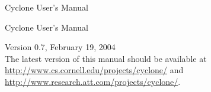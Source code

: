 \newif\ifpdf
\ifx\pdfoutput\undefined
  \pdffalse               %
\else
  \pdftrue
\fi

\usepackage{alltt}

\usepackage{makeidx}
\makeindex
\usepackage{color}
\usepackage{palatino}
\usepackage[colorlinks=true,linkcolor=bluegray,anchorcolor=bluegray,
citecolor=bluegray,filecolor=bluegray,menucolor=bluegray,pagecolor=bluegray,
urlcolor=bluegray]{hyperref}

\ifscreen
\setlength\paperheight{6in}
\setlength\paperwidth{8in}
\setlength\oddsidemargin{-.5in}
\setlength\textwidth{7in}
\setlength\topmargin{-1in}
\setlength\textheight{5in}
\ifpdf
\pdfpageheight=6in
\pdfpagewidth=8in
\fi %
\fi %

\usepackage{underscore}

\newcommand{\bs}{\texttt{\char`\\}}
\newcommand{\lb}{\texttt{\char`\{}}
\newcommand{\rb}{\texttt{\char`\}}}





\ifscreen
\thispagestyle{empty}
\textcolor{bluegray}{
\vspace{.5in}
\begin{center}
  {\fontsize{.9in}{.8in}\selectfont Cyclone User's Manual}\\[.5in]
\end{center}
}
\else
\vspace{1in}
\begin{center}
  \Huge Cyclone User's Manual
\end{center}
\fi
\begin{center}
{\Large Version 0.7, February 19, 2004}\\[3ex]
The latest version of this manual should be available at\\
\href{http://www.cs.cornell.edu/projects/cyclone/}{http://www.cs.cornell.edu/projects/cyclone/} and\\
\href{http://www.research.att.com/projects/cyclone/}{http://www.research.att.com/projects/cyclone/}.
\end{center}


